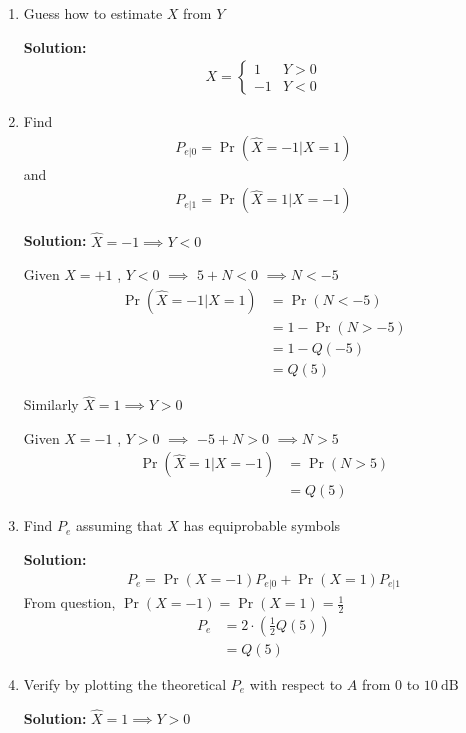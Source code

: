 \documentclass[journal,12pt,twocolumn]{IEEEtran}
\newcommand{\solution}{\noindent \textbf{Solution: }}
\providecommand{\pr}[1]{\ensuremath{\Pr\left(#1\right)}}
\numberwithin{equation}{section}
\renewcommand\thesection{\arabic{section}}
\begin{document}
\begin{enumerate}[label=\thesection.\arabic*,ref=\thesection.\theenumi]
	\item Guess how to estimate $X$ from $Y$
	
	\solution
	\begin{align}
		X = 
		\begin{cases}
			1 & Y > 0 \\
			-1 & Y < 0
		\end{cases}
	\end{align}
	
	\item Find 
	\begin{align}
		P_{e|0} = \pr{\hat{X} = -1|X=1}
	\end{align}
	and 
	\begin{align}
		P_{e|1} = \pr{\hat{X} = 1|X=-1}
	\end{align}
	
	\solution 
	$\hat{X} = -1 \implies Y < 0$
	
	Given $X = +1$ , $Y < 0$ $\implies$ $5 + N < 0$ $\implies N < -5$
	\begin{align}
		\pr{\hat{X}=-1|X=1} &= \pr{N<-5} \\
		&= 1 - \pr{N>-5} \\
		&= 1 - Q(-5)	\\
		&= Q(5)
	\end{align}
	
	Similarly $\hat{X} = 1 \implies Y > 0$
	
	Given $X = -1$ , $Y > 0$ $\implies$ $-5 + N > 0$ $\implies N > 5$
	\begin{align}
		\pr{\hat{X}=1|X=-1} &= \pr{N>5} \\
		&= Q(5)		
	\end{align}
	
	\item Find $P_e$ assuming that $X$ has equiprobable symbols
	
	\solution 
	\begin{align}
		P_e = \pr{X=-1} P_{e|0} + \pr{X=1} P_{e|1}
	\end{align}
	From question, $\pr{X=-1} = \pr{X=1} = \frac12$
	\begin{align}
		P_e &= 2 \cdot (\frac12 Q(5) ) \\
		&= Q(5)	
	\end{align}		
	
	\item Verify by plotting the theoretical $P_e$ with respect to $A$ from $0$ to $10 ~\mathrm{dB}$
	
	\solution 
	$\hat{X} = 1 \implies Y > 0$
	

\end{enumerate}
\end{document}
